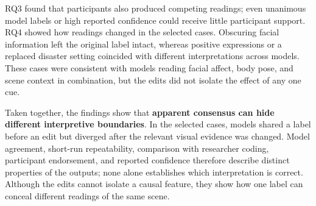 RQ3 found that participants also produced competing readings; even unanimous
model labels or high reported confidence could receive little participant
support. RQ4 showed how readings changed in the selected cases. Obscuring facial
information left the original label intact, whereas positive expressions or a
replaced disaster setting coincided with different interpretations across
models. These cases were consistent with models reading facial affect, body
pose, and scene context in combination, but the edits did not isolate the
effect of any one cue.

Taken together, the findings show that \textbf{apparent consensus can hide
different interpretive boundaries}. In the selected cases, models shared a
label before an edit but diverged after the relevant visual evidence was
changed. Model agreement, short-run repeatability, comparison with researcher
coding, participant endorsement, and reported confidence therefore describe
distinct properties of the outputs; none alone establishes which
interpretation is correct. Although the edits cannot isolate a causal feature, they show how one label
can conceal different readings of the same scene.

\FloatBarrier
